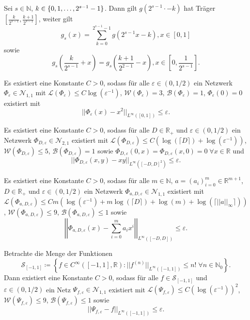 \documentclass[11pt]{scrartcl}
\newcommand{\N}{\mathbb{N}} %
\newcommand{\R}{\mathbb{R}} %
\begin{document}
\begin{lemma}
	Sei \(s\in\N\), \(k \in \{0,1,\ldots, 2^{s-1}-1\}\). Dann gilt \(g(2^{s-1} \cdot - k)\) 
    hat Träger \([\frac{k}{2^{s-1}}, \frac{k+1}{2^{s-1}}]\), weiter gilt 
    \[ g_s(x) = \sum_{k=0}^{2^{s-1}-1} g(2^{s-1}x - k), x\in [0,1] \]
    sowie 
    \[ g_s(\frac{k}{2^{s-1}}+x) = g_s(\frac{k+1}{2^{2-1}} - x), x \in [0, \frac{1}{2^{s-1}}]. \]
\end{lemma}

\begin{proposition} %
	Es existiert eine Konstante \(C>0\), sodass für alle \(\varepsilon \in (0,1/2)\) 
	ein Netzwerk \(\Phi_\varepsilon \in \mathcal{N}_{1,1}\) mit 
	\(\mathcal{L}(\Phi_\varepsilon) \leq C\log(\varepsilon^{-1})\), 
	\(\mathcal{W}(\Phi_\varepsilon) = 3\), \(\mathcal{B}(\Phi_\varepsilon) = 1\), 
	\(\Phi_\varepsilon(0) = 0\) existiert mit 
	\[ ||\Phi_\varepsilon(x) - x^2 ||_{L^\infty([0,1])} \leq \varepsilon. \]
\end{proposition}

\begin{proposition} %
	Es existiert eine Konstante \(C>0\), sodass für alle \(D\in \R_+\) und \(\varepsilon \in (0, 1/2)\) 
	ein Netzwerk \(\Phi_{D,\varepsilon} \in \mathcal{N}_{2,1}\) existiert mit 
	\(\mathcal{L}(\Phi_{D, \varepsilon}) \leq C (\log(\lceil D \rceil) + \log(\varepsilon^{-1})) \), 
	\(\mathcal{W}(\Phi_{D, \varepsilon}) \leq 5\), \(\mathcal{B}(\Phi_{D, \varepsilon}) = 1\) sowie 
	\(\Phi_{D,\varepsilon}(0,x) = \Phi_{D,\varepsilon}(x,0) = 0 \;\forall x\in \R\) und 
	\[ ||\Phi_{D,\varepsilon}(x,y) - xy||_{L^\infty([-D,D]^2)} \leq \varepsilon. \]
\end{proposition}

\begin{proposition} %
	\newcommand{\Phia}{\Phi_{a,D,\varepsilon}}
	Es existiert eine Konstante \(C>0\), sodass für alle \(m\in \N\), \(a = (a_i)_{i=0}^m \in \R^{m+1}\), 
	\(D\in \R_+\) und \(\varepsilon \in (0,1/2)\) ein Netzwerk \(\Phia \in \mathcal{N}_{1,1}\) 
	existiert mit \(\mathcal{L}(\Phia) \leq C m (\log(\varepsilon^{-1}) + m\log(\lceil D \rceil) + \log(m) + \log(\lceil ||a||_\infty \rceil))\), 
	\(\mathcal{W}(\Phia) \leq 9\), \(\mathcal{B}(\Phia) \leq 1\) sowie 
	\[ \left|\left|\Phia(x) - \sum_{i=0}^m a_i x^i \right|\right|_{L^\infty([-D,D])} \leq \varepsilon. \]
\end{proposition}

\begin{lemma} %
	Betrachte die Menge der Funktionen 
	\[ \mathcal{S}_{[-1,1]} \coloneqq \left\{ f \in C^\infty([-1,1], \R): ||f^{(n)}||_{L^\infty([-1,1])} \leq n! \;\forall n \in \N_0 \right\}. \]
	Dann existiert eine Konstante \(C>0\), sodass für alle \(f\in \mathcal{S}_{[-1,1]}\) und \(\varepsilon\in (0,1/2)\) 
	ein Netz \(\Psi_{f,\varepsilon} \in \mathcal{N}_{1,1}\) existiert mit 
	\( \mathcal{L}(\Psi_{f,\varepsilon}) \leq C(\log(\varepsilon^{-1}))^2 \), 
	\(\mathcal{W}(\Psi_{f,\varepsilon}) \leq 9\), \(\mathcal{B}(\Psi_{f,\varepsilon}) \leq 1\) 
	sowie 
	\[ ||\Psi_{f,\varepsilon} - f||_{L^\infty([-1,1])} \leq \varepsilon. \]
\end{lemma}
\end{document}

